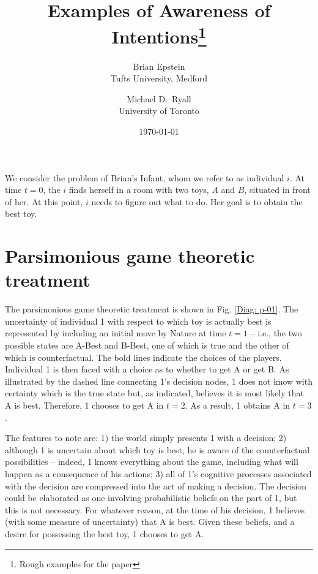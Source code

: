 \documentclass[
11pt,
titlepage,
reqno,
]{article}%
\theoremstyle{definition}
\begin{document}
	
\title
{
	Examples of Awareness of Intentions\thanks{Rough examples for the paper}
}
\author
{
	Brian Epstein \\Tufts University, Medford
	\and 
	Michael D.\ Ryall \\University of Toronto 
}
\date{\today}
\maketitle
	
	
	
\def\baselinestretch{1.5}\small\normalsize
\newcommand{\ra}[1]{\renewcommand{\arraystretch}{#1}}%
\newpage

We consider the problem of Brian's Infant, whom we refer to as individual $i$. At time $t=0$, the $i$ finds herself in a room with two toys, $A$ and $B$, situated in front of her. At this point, $i$ needs to figure out what to do. Her goal is to obtain the best toy.



\section*{Parsimonious game theoretic treatment}
The parsimonious game theoretic treatment is shown in Fig. \ref{Diag: p-01}. The uncertainty of individual 1 with respect to which toy is actually best is represented by including an initial move by Nature at time $t=1$ -- i.e., the two possible states are A-Best and B-Best, one of which is true and the other of which is counterfactual. The bold lines indicate the choices of the players. Individual 1 is then faced with a choice as to whether to get A or get B. As illustrated by the dashed line connecting 1's decision nodes, 1 does not know with certainty which is the true state but, as indicated, believes it is most likely that A is best. Therefore, 1 chooses to get A in $t=2$. As a result, 1 obtains A in $t=3$.

The features to note are: 1) the world simply presents 1 with a decision; 2) although 1 is uncertain about which toy is best, he is aware of the counterfactual possibilities -- indeed, 1 knows everything about the game, including what will happen as a consequence of his actions; 3) all of 1's cognitive processes associated with the decision are compressed into the act of making a decision. The decision could be elaborated as one involving probabilistic beliefs on the part of 1, but this is not necessary. For whatever reason, at the time of his decision, 1 believes (with some measure of uncertainty) that A is best. Given these beliefs, and a desire for possessing the best toy, 1 chooses to get A.
\end{document}
